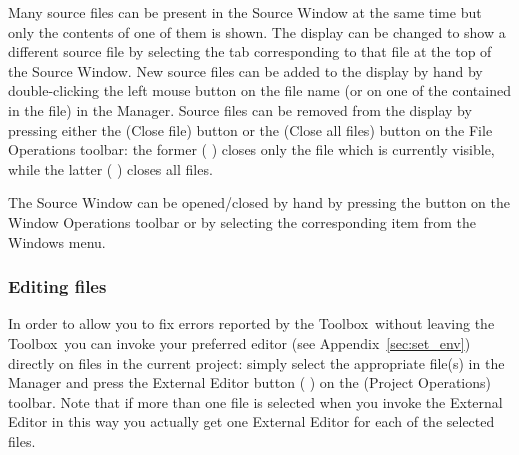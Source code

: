 \documentclass[\pformat,12pt]{article}
\newcommand{\Toolbox}{Toolbox}
\newcommand{\guicmd}[1]{{\sf #1}}
\begin{document}
Many source files can be present in the \guicmd{Source Window} at the
same time but only the contents of one of them is shown. The display
can be changed to show a different source file by selecting the tab
corresponding to that file at the top of the \guicmd{Source
  Window}. New source files can be added to the display by hand by
double-clicking the left mouse button on the file name (or on one of
the  contained in the
file) in the \guicmd{Manager}. Source files can be removed from the
display by pressing either the 
(\guicmd{Close file}) button or the 
(\guicmd{Close all files}) button on the \guicmd{File Operations}
toolbar: the former (%
)
closes only the file which is currently visible, while the latter (%
)
closes all files.

The \guicmd{Source Window} can be opened/closed by hand by pressing
the  
button on the \guicmd{Window Operations} toolbar or by
selecting the corresponding item from the \guicmd{Windows} menu.


\subsubsection{Editing files}

In order to allow you to fix errors reported by the \Toolbox\ without
leaving the \Toolbox\ you can invoke your preferred editor (see
Appendix~\ref{sec:set_env}) directly on files in the current project:
simply select the appropriate file(s) in the \guicmd{Manager} and
press the \guicmd{External Editor} button (%
) 
on the (\guicmd{Project Operations}) toolbar. Note that if more than
one file is selected when you invoke the \guicmd{External Editor} in
this way you actually get one \guicmd{External Editor} for each of the
selected files.
\end{document}

